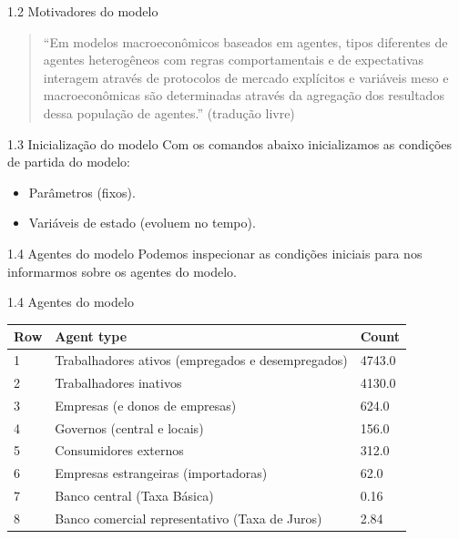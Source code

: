 \documentclass[aspectratio=169,11pt]{beamer}
\begin{document}
\begin{frame}[allowframebreaks]{1.2 Motivadores do modelo}
\normalsize
\begin{quote}
``Em modelos macroeconômicos baseados em agentes, tipos diferentes de agentes heterogêneos com regras comportamentais e de expectativas interagem através de protocolos de mercado explícitos e variáveis meso e macroeconômicas são determinadas através da agregação dos resultados dessa população de agentes.'' (tradução livre)
\end{quote}
\end{frame}


\begin{frame}[allowframebreaks]{1.3 Inicialização do modelo}
\normalsize
Com os comandos abaixo inicializamos as condições de partida do modelo:

\begin{itemize}
\item
  Parâmetros (fixos).
\item
  Variáveis de estado (evoluem no tempo).
\end{itemize}
\end{frame}


\begin{frame}[allowframebreaks]{1.4 Agentes do modelo}
\normalsize
Podemos inspecionar as condições iniciais para nos informarmos sobre os agentes do modelo.
\end{frame}


\begin{frame}{1.4 Agentes do modelo}
\small
\begin{tabularx}{\textwidth}{lXX}
Row & Agent type & Count \\
\hline
1 & Trabalhadores ativos (empregados e desempregados) & 4743.0 \\
2 & Trabalhadores inativos & 4130.0 \\
3 & Empresas (e donos de empresas) & 624.0 \\
4 & Governos (central e locais) & 156.0 \\
5 & Consumidores externos & 312.0 \\
6 & Empresas estrangeiras (importadoras) & 62.0 \\
7 & Banco central (Taxa Básica) & 0.16 \\
8 & Banco comercial representativo (Taxa de Juros) & 2.84 \\
\end{tabularx}
\end{frame}
\end{document}
